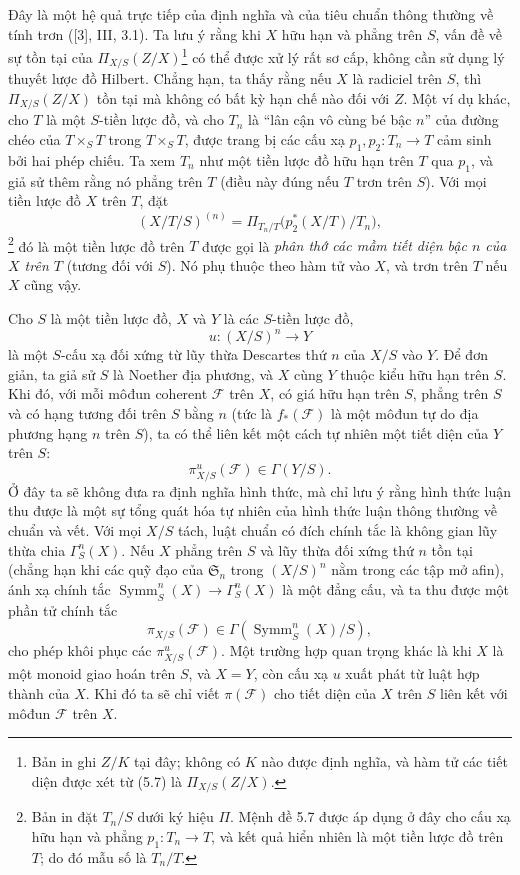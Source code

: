Đây là một hệ quả trực tiếp của định nghĩa và của tiêu chuẩn thông thường về
tính trơn ([3], III, 3.1). Ta lưu ý rằng khi $X$ hữu hạn và phẳng trên $S$,
vấn đề về sự tồn tại của
$\Pi_{X/S}(Z/X)$\footnote{Bản in ghi $Z/K$ tại đây; không có $K$ nào được định
nghĩa, và hàm tử các tiết diện được xét từ (5.7) là $\Pi_{X/S}(Z/X)$.} có thể
được xử lý rất sơ cấp, không cần
sử dụng lý thuyết lược đồ Hilbert. Chẳng hạn, ta thấy rằng nếu $X$ là
radiciel trên $S$, thì $\Pi_{X/S}(Z/X)$ tồn tại mà không có bất kỳ hạn chế nào
đối với $Z$. Một ví dụ khác, cho $T$ là một $S$-tiền lược đồ, và cho $T_n$ là
``lân cận vô cùng bé bậc $n$'' của đường chéo của $T\times_ST$ trong
$T\times_ST$, được trang bị các cấu xạ $p_1,p_2:T_n\longrightarrow T$ cảm
sinh bởi hai phép chiếu. Ta xem $T_n$ như một tiền lược đồ hữu hạn trên $T$
qua $p_1$, và giả sử thêm rằng nó phẳng trên $T$ (điều này đúng nếu $T$ trơn
trên $S$). Với mọi tiền lược đồ $X$ trên $T$, đặt
\[
(X/T/S)^{(n)}=
\Pi_{T_n/T}\bigl(p_2^*(X/T)/T_n\bigr),
\]
\footnote{Bản in đặt $T_n/S$ dưới ký hiệu $\Pi$. Mệnh đề 5.7 được áp dụng ở
đây cho cấu xạ hữu hạn và phẳng $p_1:T_n\to T$, và kết quả hiển nhiên là một
tiền lược đồ trên $T$; do đó mẫu số là $T_n/T$.}
đó là một tiền lược đồ trên $T$ được gọi là \emph{phân thớ các mầm tiết diện
bậc $n$ của $X$ trên $T$} (tương đối với $S$). Nó phụ thuộc theo hàm tử vào
$X$, và trơn trên $T$ nếu $X$ cũng vậy.


Cho $S$ là một tiền lược đồ, $X$ và $Y$ là các $S$-tiền lược đồ,
\[
u:(X/S)^n\longrightarrow Y
\]
là một $S$-cấu xạ đối xứng từ lũy thừa Descartes thứ $n$ của $X/S$ vào $Y$.
Để đơn giản, ta giả sử $S$ là Noether địa phương, và $X$ cùng $Y$ thuộc kiểu
hữu hạn trên $S$. Khi đó, với mỗi môđun coherent $\mathcal F$ trên $X$, có giá
hữu hạn trên $S$, phẳng trên $S$ và có hạng tương đối trên $S$ bằng $n$ (tức
là $f_*(\mathcal F)$ là một môđun tự do địa phương hạng $n$ trên $S$), ta có
thể liên kết một cách tự nhiên một tiết diện của $Y$ trên $S$:
\[
\pi^u_{X/S}(\mathcal F)\in\Gamma(Y/S).
\]
Ở đây ta sẽ không đưa ra định nghĩa hình thức, mà chỉ lưu ý rằng hình thức
luận thu được là một sự tổng quát hóa tự nhiên của hình thức luận thông thường
về chuẩn và vết. Với mọi $X/S$ tách, luật chuẩn có đích chính tắc là không gian lũy thừa chia $\Gamma^n_S(X)$. Nếu $X$ phẳng trên $S$ và lũy thừa đối xứng thứ $n$ tồn tại (chẳng hạn khi các quỹ đạo của $\mathfrak S_n$ trong $(X/S)^n$ nằm trong các tập mở afin), ánh xạ chính tắc $\operatorname{Symm}^n_S(X)\to\Gamma^n_S(X)$ là một đẳng cấu, và ta thu được một phần tử chính tắc
\[
\pi_{X/S}(\mathcal F)\in\Gamma(\operatorname{Symm}^n_S(X)/S),
\]
cho phép khôi phục các $\pi^u_{X/S}(\mathcal F)$. Một trường hợp quan trọng
khác là khi $X$ là một monoid giao hoán trên $S$, và $X=Y$, còn cấu xạ $u$
xuất phát từ luật hợp thành của $X$. Khi đó ta sẽ chỉ viết $\pi(\mathcal F)$
cho tiết diện của $X$ trên $S$ liên kết với môđun $\mathcal F$ trên $X$.

